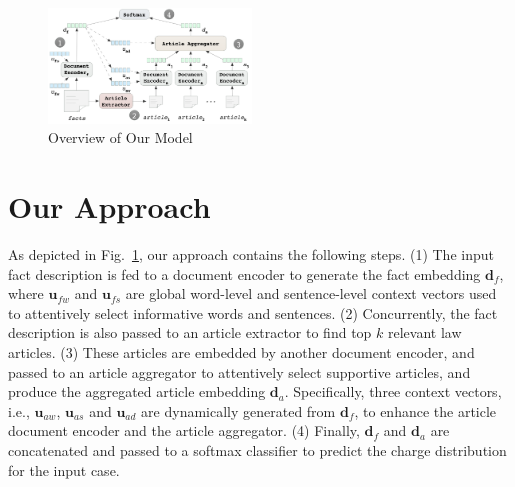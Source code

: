 
\begin{figure}[t!]
\begin{center}
\includegraphics[width=0.48\textwidth]{figures/charge_pred_overview.png}	
\caption{Overview of Our Model}
\label{fig_model_framework}
\end{center}
\end{figure}

\section{Our Approach}
As depicted in Fig.~\ref{fig_model_framework}, our approach contains the following steps.
(1) The input fact description is fed to a document encoder to generate the fact embedding $\mathbf{d}_f$, where $\mathbf{u}_{fw}$ and $\mathbf{u}_{fs}$ are global word-level and sentence-level context vectors used to attentively select informative words and sentences.
(2) Concurrently, the fact description is also passed to an article extractor to find top $k$ relevant law articles. 
(3) These articles are embedded by another document encoder, and  passed to an article aggregator to attentively select supportive articles, and produce the aggregated article embedding $\mathbf{d}_a$. Specifically, three context vectors, i.e., $\mathbf{u}_{aw}$, $\mathbf{u}_{as}$ and $\mathbf{u}_{ad}$ are dynamically generated from $\mathbf{d}_f$, to enhance the article document encoder and the article aggregator. 
(4) Finally, $\mathbf{d}_f$ and $\mathbf{d}_a$ are concatenated and passed to a softmax classifier to predict the charge distribution for the input case.


